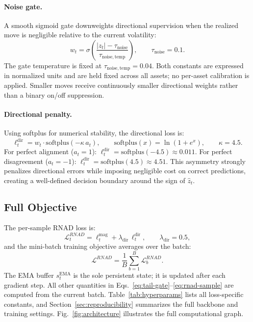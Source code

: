 \documentclass[11pt]{article}
\newcommand{\RNAD}{RNAD\xspace}
\begin{document}
\paragraph{Noise gate.}
A smooth sigmoid gate downweights directional supervision when the
realized move is negligible relative to the current volatility:
\begin{equation}
  w_t = \sigma\!\left(\frac{|z_t| - \tau_{\mathrm{noise}}}{\tau_{\mathrm{noise,temp}}}\right),
  \qquad
  \tau_{\mathrm{noise}} = 0.1.
  \label{eq:noise-gate}
\end{equation}
The gate temperature is fixed at $\tau_{\mathrm{noise,temp}} = 0.04$.
Both constants are expressed in normalized units and are held fixed
across all assets; no per-asset calibration is applied. Smaller moves
receive continuously smaller directional weights rather than a binary
on/off suppression.

\paragraph{Directional penalty.}
Using softplus for numerical stability, the directional loss is:
\begin{equation}
  \ell_t^{\mathrm{dir}}
  = w_t \cdot \mathrm{softplus}\!\left(-\kappa\,a_t\right),
  \qquad
  \mathrm{softplus}(x) = \ln(1 + e^x),
  \qquad
  \kappa = 4.5.
  \label{eq:dir-loss}
\end{equation}
For perfect alignment ($a_t = 1$): $\ell_t^{\mathrm{dir}} =
\mathrm{softplus}(-4.5) \approx 0.011$. For perfect disagreement
($a_t = -1$): $\ell_t^{\mathrm{dir}} = \mathrm{softplus}(4.5)
\approx 4.51$. This asymmetry strongly penalizes directional errors
while imposing negligible cost on correct predictions, creating a
well-defined decision boundary around the sign of $\hat{z}_t$.

\subsection{Full Objective}
\label{ssec:full-loss}

The per-sample \RNAD loss is:
\begin{equation}
  \mathcal{L}_t^{\RNAD}
  = \ell_t^{\mathrm{mag}}
  + \lambda_{\mathrm{dir}}\,\ell_t^{\mathrm{dir}},
  \qquad
  \lambda_{\mathrm{dir}} = 0.5,
  \label{eq:rnad-sample}
\end{equation}
and the mini-batch training objective averages over the batch:
\begin{equation}
  \mathcal{L}^{\RNAD}
  = \frac{1}{B}\sum_{b=1}^{B}\mathcal{L}_{b}^{\RNAD}.
  \label{eq:rnad-batch}
\end{equation}
The EMA buffer $s_t^{\mathrm{EMA}}$ is the sole persistent state;
it is updated after each gradient step. All other quantities in
Eqs.~\eqref{eq:tail-gate}--\eqref{eq:rnad-sample} are computed
from the current batch. Table~\ref{tab:hyperparams} lists all
loss-specific constants, and Section~\ref{sec:reproducibility}
summarizes the full backbone and training settings.
Fig.~\ref{fig:architecture} illustrates the full computational graph.
\end{document}
